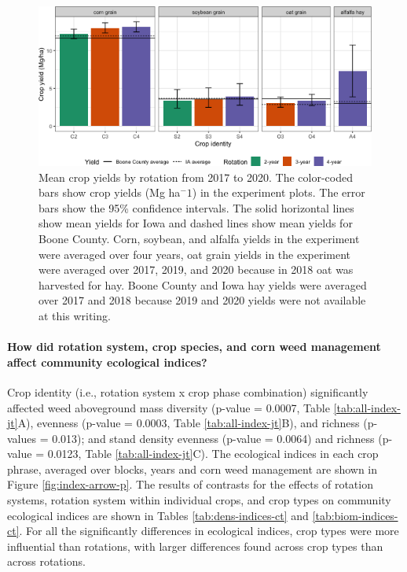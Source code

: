\documentclass[
]{article}
\begin{document}
\begin{figure}
\centering
\includegraphics{Manuscript_whole_files/figure-latex/crop-bar-1.png}
\caption{\label{fig:crop-bar}Mean crop yields by rotation from 2017 to 2020. The color-coded bars show crop yields (Mg ha\(^-1\)) in the experiment plots. The error bars show the 95\% confidence intervals. The solid horizontal lines show mean yields for Iowa and dashed lines show mean yields for Boone County. Corn, soybean, and alfalfa yields in the experiment were averaged over four years, oat grain yields in the experiment were averaged over 2017, 2019, and 2020 because in 2018 oat was harvested for hay. Boone County and Iowa hay yields were averaged over 2017 and 2018 because 2019 and 2020 yields were not available at this writing.}
\end{figure}

\hypertarget{how-did-rotation-system-crop-species-and-corn-weed-management-affect-community-ecological-indices}{%
\paragraph*{How did rotation system, crop species, and corn weed management affect community ecological indices?}\label{how-did-rotation-system-crop-species-and-corn-weed-management-affect-community-ecological-indices}}

Crop identity (i.e., rotation system x crop phase combination) significantly affected weed aboveground mass diversity (p-value = 0.0007, Table \ref{tab:all-index-jt}A), evenness (p-value = 0.0003, Table \ref{tab:all-index-jt}B), and richness (p-values = 0.013); and stand density evenness (p-value = 0.0064) and richness (p-value = 0.0123, Table \ref{tab:all-index-jt}C). The ecological indices in each crop phrase, averaged over blocks, years and corn weed management are shown in Figure \ref{fig:index-arrow-p}. The results of contrasts for the effects of rotation systems, rotation system within individual crops, and crop types on community ecological indices are shown in Tables \ref{tab:dens-indices-ct} and \ref{tab:biom-indices-ct}. For all the significantly differences in ecological indices, crop types were more influential than rotations, with larger differences found across crop types than across rotations.
\end{document}

